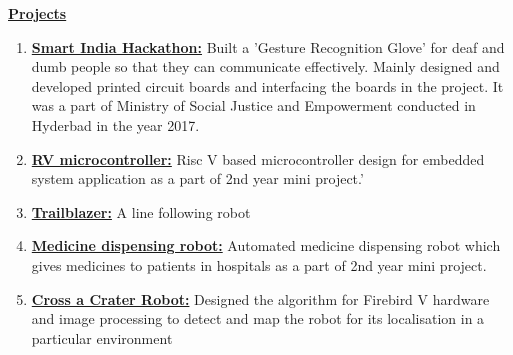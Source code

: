 \documentclass[10pt]{article}
\begin{document}
	\hfill 
	
	\underline{\textbf{\Large{Projects}}}
	\begin{enumerate}
		\item{\underline{\textbf{\large{Smart India Hackathon:}}} Built a 'Gesture Recognition Glove' for deaf and dumb people so that they can communicate effectively. Mainly designed and developed printed circuit boards and interfacing the boards in the project. It was a part of Ministry of Social Justice and Empowerment conducted in Hyderbad in the year 2017.}
		\item{\underline{\textbf{\large{RV microcontroller:}}} Risc V based microcontroller design for embedded system application as a part of 2nd year mini project.'}
		\item{\underline{\textbf{\large{Trailblazer:}}} A line following robot}
		\item{\underline{\textbf{\large{Medicine dispensing robot:}}} Automated medicine dispensing robot which gives medicines to patients in hospitals as a part of 2nd year mini project.}
		\item{\underline{\textbf{\large{Cross a Crater Robot:}}} Designed the algorithm for Firebird V hardware and image processing to detect and map the robot for its localisation in a particular environment} 
	\end{enumerate}
	
	\hfill
\end{document}
